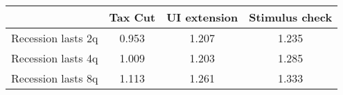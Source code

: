 \begin{tabular}{@{}lccc@{}} 
\toprule 
& Tax Cut    & UI extension    & Stimulus check    \\  \midrule 
Recession lasts 2q &0.953  & 1.207  & 1.235     \\ 
Recession lasts 4q &1.009  & 1.203  & 1.285     \\ 
Recession lasts 8q &1.113  & 1.261  & 1.333     \\ 
\end{tabular}  
